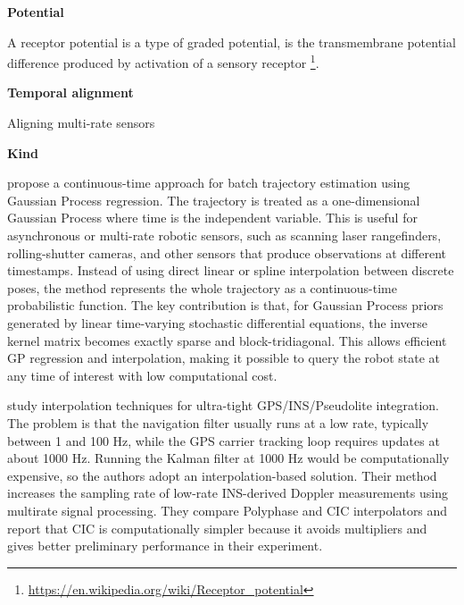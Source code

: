 \documentclass{book}
\providecommand{\ProjectDeepHeading}[2]{%
    \par\medskip\noindent\textbf{#2}\par\smallskip
}
\providecommand{\seeherefooter}[1]{\footnote{\url{#1}}}
\begin{document}
\ProjectDeepHeading{4}{Potential}


A receptor potential is a type of graded potential, is the transmembrane potential difference produced by activation of a sensory receptor \seeherefooter{https://en.wikipedia.org/wiki/Receptor_potential}.

\ProjectDeepHeading{4}{Temporal alignment}


Aligning multi-rate sensors

\ProjectDeepHeading{5}{Kind}


\cite{barfoot-2014-batch-continuous-time-trajectory-estimation-as-exactly-sparse-gaussian-process-regression} propose a continuous-time approach for batch trajectory estimation using Gaussian Process regression. The trajectory is treated as a one-dimensional Gaussian Process where time is the independent variable. This is useful for asynchronous or multi-rate robotic sensors, such as scanning laser rangefinders, rolling-shutter cameras, and other sensors that produce observations at different timestamps. Instead of using direct linear or spline interpolation between discrete poses, the method represents the whole trajectory as a continuous-time probabilistic function. The key contribution is that, for Gaussian Process priors generated by linear time-varying stochastic differential equations, the inverse kernel matrix becomes exactly sparse and block-tridiagonal. This allows efficient GP regression and interpolation, making it possible to query the robot state at any time of interest with low computational cost.


\cite{babu-2005-comparative-study-of-interpolation-techniques-for-ultra-tight-integration-of-gps-ins-pl-sensors} study interpolation techniques for ultra-tight GPS/INS/Pseudolite integration. The problem is that the navigation filter usually runs at a low rate, typically between 1 and 100 Hz, while the GPS carrier tracking loop requires updates at about 1000 Hz. Running the Kalman filter at 1000 Hz would be computationally expensive, so the authors adopt an interpolation-based solution. Their method increases the sampling rate of low-rate INS-derived Doppler measurements using multirate signal processing. They compare Polyphase and CIC interpolators and report that CIC is computationally simpler because it avoids multipliers and gives better preliminary performance in their experiment.
\end{document}
